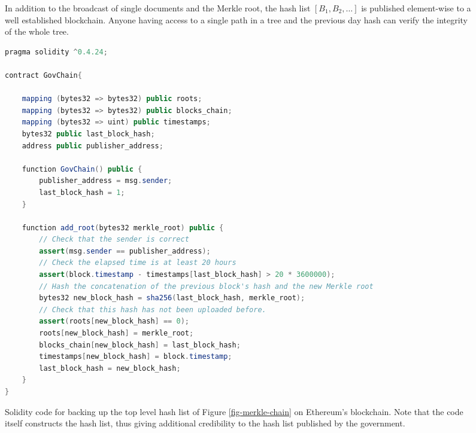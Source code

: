 \begin{figure}
\caption{In addition to the broadcast of single documents and the Merkle root, the hash list $[B_1,B_2,\dots]$ is published element-wise to a well established blockchain. Anyone having access to a single path in a tree and the previous day hash can verify the integrity of the whole tree.}
\label{fig-merkle-blockchain}
\end{figure}

\lstset{basicstyle=\footnotesize}
\lstset{
  numbers=left,
  stepnumber=1,    
  firstnumber=1,
  numberfirstline=true
}
\begin{figure*}
\begin{lstlisting}[language=java]
pragma solidity ^0.4.24;

contract GovChain{

    mapping (bytes32 => bytes32) public roots;
    mapping (bytes32 => bytes32) public blocks_chain;
    mapping (bytes32 => uint) public timestamps;
    bytes32 public last_block_hash;
    address public publisher_address;

    function GovChain() public {
        publisher_address = msg.sender;
        last_block_hash = 1;
    }

    function add_root(bytes32 merkle_root) public {
        // Check that the sender is correct
        assert(msg.sender == publisher_address);
        // Check the elapsed time is at least 20 hours
        assert(block.timestamp - timestamps[last_block_hash] > 20 * 3600000);        
        // Hash the concatenation of the previous block's hash and the new Merkle root
        bytes32 new_block_hash = sha256(last_block_hash, merkle_root);
        // Check that this hash has not been uploaded before.
        assert(roots[new_block_hash] == 0);
        roots[new_block_hash] = merkle_root;
        blocks_chain[new_block_hash] = last_block_hash;
        timestamps[new_block_hash] = block.timestamp;
        last_block_hash = new_block_hash;
    }
}

\end{lstlisting}
\caption{Solidity code for backing up the top level hash list of Figure \ref{fig-merkle-chain} on Ethereum's blockchain. Note that the code itself constructs the hash list, thus giving additional credibility to the hash list published by the government.}
\label{contract}
\end{figure*}

